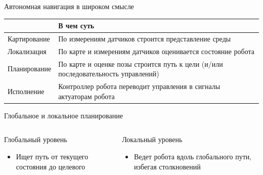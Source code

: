 \documentclass[aspectratio=169]{beamer}
\newcommand{\term}[1]{{\textcolor{HSEblue}{#1}}}
\begin{document}
\begin{frame}{Автономная навигация в широком смысле}

\renewcommand{\arraystretch}{1.2}
\begin{tabular}{>{\raggedright\arraybackslash}m{}>{\raggedright\arraybackslash}m{}}
\toprule
\term{Задача} & \term{В чем суть} \\
\midrule

Картирование & По измерениям датчиков строится представление среды \\
Локализация & По карте и измерениям датчиков оценивается состояние робота \\
\rowcolor{HSEblue!15}Планирование & По карте и оценке позы строится путь к цели (и/или последовательность управлений) \\
Исполнение & Контроллер робота переводит управления в сигналы актуаторам робота\\
\bottomrule
\end{tabular}
\vfill

\end{frame}

\begin{frame}{Глобальное и локальное планирование}
\begin{columns}[T,onlytextwidth]
\begin{block}{Глобальный уровень}
  \begin{itemize}
    \item Ищет путь от текущего состояния до целевого
  \end{itemize}

\end{block}
\begin{block}{Локальный уровень}
    \begin{itemize}
    \item Ведет робота вдоль глобального пути, избегая столкновений
  \end{itemize}
\end{block}
\end{columns}
\end{frame}
\end{document}
